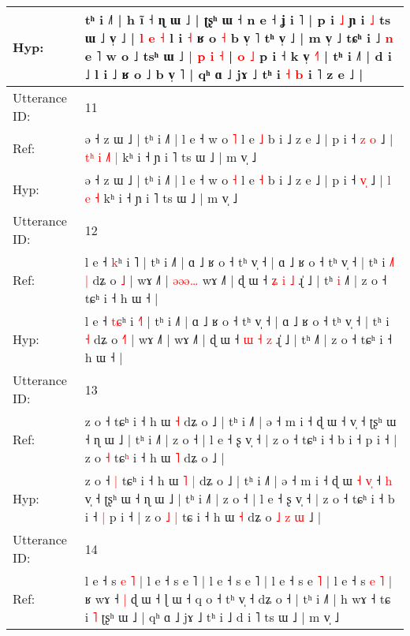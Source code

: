 \documentclass[10pt]{article}
\DeclareRobustCommand{\hl}[1]{{\textcolor{red}{#1}}}
\begin{document}
\begin{longtable}{ll}
 \\
Hyp: & tʰ i ˩˥ | h ĩ ˧ ɳ ɯ ˩ | ʈʂʰ ɯ ˧ n e ˧ ʝ i ˥ | p i \hl{˩} ɲ i \hl{˩} ts ɯ ˩\hl{}\hl{}\hl{}\hl{} v̩ ˩ | \hl{l} \hl{e} \hl{˧} l i \hl{˧} ʁ o \hl{˧} b v̩ ˥ tʰ v̩ ˩ | m v̩ ˩ tɕʰ i ˩ \hl{n} e ˥ w o ˩ tsʰ ɯ ˩\hl{ }\hl{|}\hl{ }\hl{p}\hl{ }\hl{i}\hl{ }\hl{˧} |\hl{ }\hl{o}\hl{ }\hl{˩} p i ˧ k v̩ \hl{˧}\hl{˥} | tʰ i ˩˥ | d i ˩ l i ˩ ʁ o ˩ b v̩ ˥ | qʰ ɑ ˩ jɤ ˩ tʰ i \hl{˧} \hl{b} i ˥ z e ˩ |
 \\
\midrule
Utterance ID: & 11 \\
Ref: & ə ˧ z ɯ ˩ | tʰ i ˩˥ | l e ˧ w o \hl{˥} l e \hl{˩} b i ˩ z e ˩ | p i ˧ \hl{z}\hl{ }\hl{o} ˩ |\hl{ }\hl{t}\hl{ʰ} \hl{i} \hl{˩}\hl{˥} \hl{|} kʰ i ˧ ɲ i ˥ ts ɯ ˩ | m v̩ ˩
 \\
Hyp: & ə ˧ z ɯ ˩ | tʰ i ˩˥ | l e ˧ w o \hl{˧} l e \hl{˧} b i ˩ z e ˩ | p i ˧ \hl{}\hl{v}\hl{̩} ˩ |\hl{}\hl{}\hl{} \hl{l} \hl{}\hl{e} \hl{˧} kʰ i ˧ ɲ i ˥ ts ɯ ˩ | m v̩ ˩
 \\
\midrule
Utterance ID: & 12 \\
Ref: & l e ˧ \hl{}\hl{k}ʰ i \hl{}˥ | tʰ i ˩˥ | ɑ ˩ ʁ o ˧ tʰ v̩ ˧ | ɑ ˩ ʁ o ˧ tʰ v̩ ˧ | tʰ i\hl{ }\hl{˩}\hl{˥} \hl{|} dʑ o \hl{}\hl{˩} | wɤ ˩˥ |\hl{ }\hl{ə}\hl{ə}\hl{ə}\hl{…} wɤ ˩˥ | ɖ ɯ ˧ \hl{ʑ} \hl{i} \hl{˩} ɻ̍ ˩ | tʰ\hl{ }\hl{i} ˩˥ | z o ˧ tɕʰ i ˧ h ɯ ˧ |
 \\
Hyp: & l e ˧ \hl{t}\hl{ɕ}ʰ i \hl{˧}˥ | tʰ i ˩˥ | ɑ ˩ ʁ o ˧ tʰ v̩ ˧ | ɑ ˩ ʁ o ˧ tʰ v̩ ˧ | tʰ i\hl{}\hl{}\hl{} \hl{˧} dʑ o \hl{˧}\hl{˥} | wɤ ˩˥ |\hl{}\hl{}\hl{}\hl{}\hl{} wɤ ˩˥ | ɖ ɯ ˧ \hl{ɯ} \hl{˧} \hl{z} ɻ̍ ˩ | tʰ\hl{}\hl{} ˩˥ | z o ˧ tɕʰ i ˧ h ɯ ˧ |
 \\
\midrule
Utterance ID: & 13 \\
Ref: & z o ˧\hl{}\hl{} tɕʰ i ˧ h ɯ\hl{}\hl{} \hl{˧} dʑ o ˩ | tʰ i ˩˥ | ə ˧ m i ˧ ɖ ɯ\hl{}\hl{}\hl{}\hl{}\hl{} ˧\hl{}\hl{} v̩ ˧ ʈʂʰ ɯ ˧ ɳ ɯ ˩ | tʰ i ˩˥ | z o ˧ | l e ˧ ʂ v̩ ˧ | z o ˧ tɕʰ i ˧ b i ˧\hl{}\hl{} p i ˧ | z o\hl{}\hl{} \hl{˧} tɕ\hl{ʰ} i ˧ h ɯ \hl{˥} dʑ o\hl{}\hl{}\hl{}\hl{}\hl{}\hl{} ˩ |
 \\
Hyp: & z o ˧\hl{ }\hl{|} tɕʰ i ˧ h ɯ\hl{ }\hl{˥} \hl{|} dʑ o ˩ | tʰ i ˩˥ | ə ˧ m i ˧ ɖ ɯ\hl{ }\hl{˧}\hl{ }\hl{v}\hl{̩} ˧\hl{ }\hl{h} v̩ ˧ ʈʂʰ ɯ ˧ ɳ ɯ ˩ | tʰ i ˩˥ | z o ˧ | l e ˧ ʂ v̩ ˧ | z o ˧ tɕʰ i ˧ b i ˧\hl{ }\hl{|} p i ˧ | z o\hl{ }\hl{˩} \hl{|} tɕ\hl{} i ˧ h ɯ \hl{˧} dʑ o\hl{ }\hl{˩}\hl{ }\hl{z}\hl{ }\hl{ɯ} ˩ |
 \\
\midrule
Utterance ID: & 14 \\
Ref: & l e ˧ s \hl{e} \hl{˥} | l e ˧ s e ˥ | l e ˧ s e ˥ | l e ˧ s e \hl{˥} | l e ˧ s \hl{}\hl{e} \hl{˥} | ʁ wɤ ˧\hl{ }\hl{|} ɖ ɯ ˧ ɭ ɯ ˧ q o ˧ tʰ v̩ ˧ dʑ o ˧ | tʰ i ˩˥ | h wɤ ˧ tɕ i \hl{˥} ʈʂʰ ɯ ˩ | qʰ ɑ ˩ jɤ ˩ tʰ i ˩ d i ˥ ts ɯ ˩ | m v̩ ˩

\end{longtable}
\end{document}
